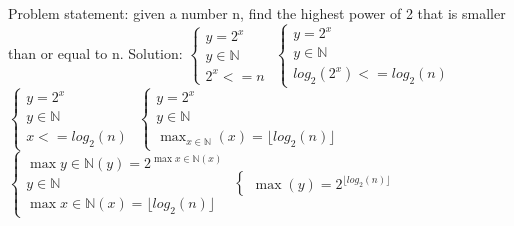 \documentclass{article}
\begin{document}
    Problem statement: given a number n, find the highest power of 2 that is smaller than or equal to n.
    \newline
    Solution:
    \newline
    $\begin{cases}
         y = 2^x \\ y \in \mathbb{N} \\ 2^x <= n
    \end{cases}$
    \newline
    $\begin{cases}
         y = 2^x \\ y \in \mathbb{N} \\ log_2(2^x) <= log_2(n)
    \end{cases}$
    \newline
    $\begin{cases}
         y = 2^x \\ y \in \mathbb{N} \\ x <= log_2(n)
    \end{cases}$
    \newline
    $\begin{cases}
         y = 2^x \\ y \in \mathbb{N} \\ \max_{x \in \mathbb{N}}(x) = \lfloor log_2(n) \rfloor
    \end{cases}$
    \newline
    $\begin{cases}
         \max{y \in \mathbb{N}}(y) = 2^{\max{x \in \mathbb{N}}(x)} \\ y \in \mathbb{N} \\ \max{x \in \mathbb{N}}(x) = \lfloor log_2(n) \rfloor
    \end{cases}$
    \newline
    $\begin{cases}
         \max(y) = 2^{\lfloor log_2(n) \rfloor}
    \end{cases}$
\end{document}
